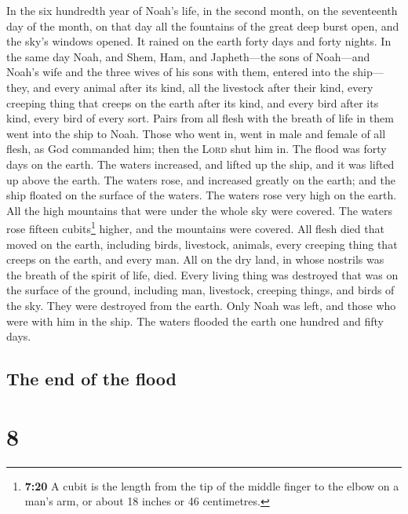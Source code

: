  In the six hundredth year of Noah's life, in the second
month, on the seventeenth day of the month, on that day all the
fountains of the great deep burst open, and the sky's windows opened.
 It rained on the earth forty days and forty nights.
 In the same day Noah, and Shem, Ham, and Japheth---the
sons of Noah---and Noah's wife and the three wives of his sons with
them, entered into the ship---  they, and every animal
after its kind, all the livestock after their kind, every creeping thing
that creeps on the earth after its kind, and every bird after its kind,
every bird of every sort.  Pairs from all flesh with the
breath of life in them went into the ship to Noah.  Those
who went in, went in male and female of all flesh, as God commanded him;
then the \textsc{Lord} shut him in.  The flood was forty
days on the earth. The waters increased, and lifted up the ship, and it
was lifted up above the earth.  The waters rose, and
increased greatly on the earth; and the ship floated on the surface of
the waters.  The waters rose very high on the earth. All
the high mountains that were under the whole sky were covered.
 The waters rose fifteen cubits\footnote{\textbf{7:20} A
  cubit is the length from the tip of the middle finger to the elbow on
  a man's arm, or about 18 inches or 46 centimetres.} higher, and the
mountains were covered.  All flesh died that moved on the
earth, including birds, livestock, animals, every creeping thing that
creeps on the earth, and every man.  All on the dry land,
in whose nostrils was the breath of the spirit of life, died.
 Every living thing was destroyed that was on the surface
of the ground, including man, livestock, creeping things, and birds of
the sky. They were destroyed from the earth. Only Noah was left, and
those who were with him in the ship.  The waters flooded
the earth one hundred and fifty days.

\hypertarget{the-end-of-the-flood}{%
\subsection{The end of the flood}\label{the-end-of-the-flood}}

\hypertarget{section-7}{%
\section{8}\label{section-7}}

